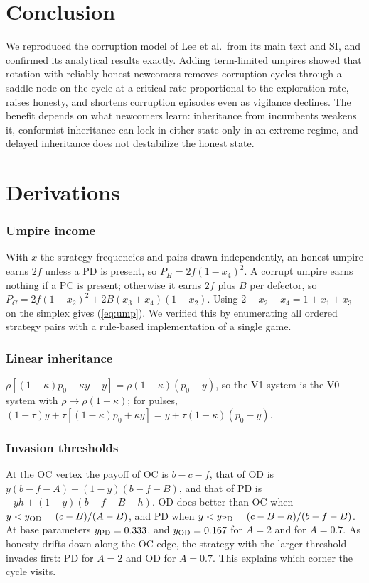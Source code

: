 \documentclass[journal]{IEEEtran}
\begin{document}
\section{Conclusion}
We reproduced the corruption model of Lee et al.\ from its main text and SI, and confirmed its
analytical results exactly. Adding term-limited
umpires showed that rotation with reliably honest newcomers removes corruption cycles through a
saddle-node on the cycle at a critical rate proportional to the exploration rate, raises honesty,
and shortens corruption episodes even as vigilance declines. The benefit depends on what newcomers
learn: inheritance from incumbents weakens it, conformist inheritance can lock in either state only
in an extreme regime, and delayed inheritance does not destabilize the honest state.

\appendices

\section{Derivations}\label{app:deriv}

\subsubsection{Umpire income} With $x$ the strategy frequencies and pairs drawn independently, an
honest umpire earns $2f$ unless a PD is present, so $P_H=2f(1-x_4)^2$. A corrupt umpire earns
nothing if a PC is present; otherwise it earns $2f$ plus $B$ per defector, so
$P_C=2f(1-x_2)^2+2B(x_3+x_4)(1-x_2)$. Using $2-x_2-x_4=1+x_1+x_3$ on the simplex gives
(\ref{eq:ump}). We verified this by enumerating all ordered strategy pairs with a rule-based
implementation of a single game.

\subsubsection{Linear inheritance} $\rho[(1-\kappa)p_0+\kappa y-y]=\rho(1-\kappa)(p_0-y)$, so the
V1 system is the V0 system with $\rho\to\rho(1-\kappa)$; for pulses,
$(1-\tau)y+\tau[(1-\kappa)p_0+\kappa y]=y+\tau(1-\kappa)(p_0-y)$.

\subsubsection{Invasion thresholds} At the OC vertex the payoff of OC is $b-c-f$, that of OD is
$y(b-f-A)+(1-y)(b-f-B)$, and that of PD is $-yh+(1-y)(b-f-B-h)$. OD does better than OC when
$y<y_{\rm OD}=(c-B)/(A-B)$, and PD when $y<y_{\rm PD}=(c-B-h)/(b-f-B)$. At base parameters
$y_{\rm PD}=0.333$, and $y_{\rm OD}=0.167$ for $A=2$ and \yODB{} for $A=0.7$. As honesty drifts down
along the OC edge, the strategy with the larger threshold invades first: PD for $A=2$ and OD for
$A=0.7$. This explains which corner the cycle visits.
\end{document}
